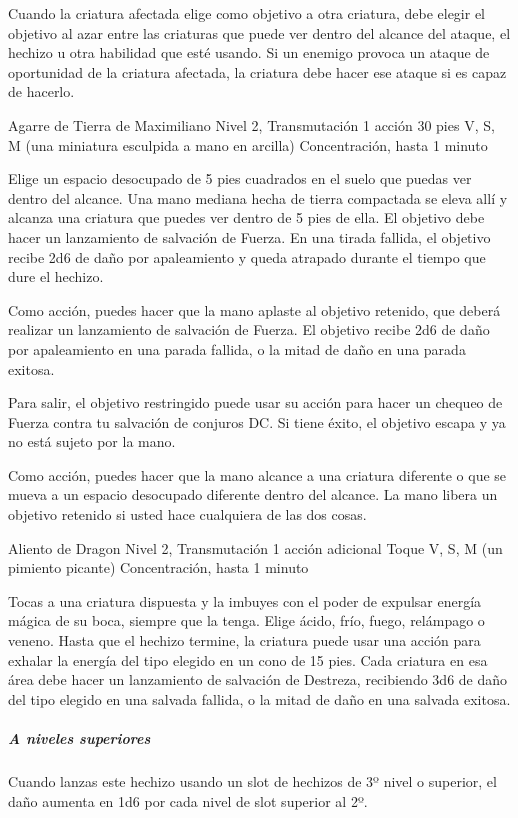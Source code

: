 \documentclass[a4paper,twocolumn,openany,10pt]{dndbook}
\begin{document}
	Cuando la criatura afectada elige como objetivo a otra criatura, debe elegir el objetivo al azar entre las criaturas que
	puede ver dentro del alcance del ataque, el hechizo u otra habilidad que esté usando. Si un enemigo provoca un ataque de
	oportunidad de la criatura afectada, la criatura debe hacer ese ataque si es capaz de hacerlo.

\spellheader%
	{Agarre de Tierra de Maximiliano}
	{Nivel 2, Transmutación}
	{1 acción}
	{30 pies}
	{V, S, M (una miniatura esculpida a mano en arcilla)}
	{Concentración, hasta 1 minuto}
	
	Elige un espacio desocupado de 5 pies cuadrados en el suelo que puedas ver dentro del alcance. Una mano mediana hecha de
	tierra compactada se eleva allí y alcanza una criatura que puedes ver dentro de 5 pies de ella. El objetivo debe hacer un
	lanzamiento de salvación de Fuerza. En una tirada fallida, el objetivo recibe 2d6 de daño por apaleamiento y queda atrapado
	durante el tiempo que dure el hechizo.
	
	Como acción, puedes hacer que la mano aplaste al objetivo retenido, que deberá realizar un lanzamiento de salvación de
	Fuerza. El objetivo recibe 2d6 de daño por apaleamiento en una parada fallida, o la mitad de daño en una parada exitosa.
	
	Para salir, el objetivo restringido puede usar su acción para hacer un chequeo de Fuerza contra tu salvación de conjuros DC.
	Si tiene éxito, el objetivo escapa y ya no está sujeto por la mano.
	
	Como acción, puedes hacer que la mano alcance a una criatura diferente o que se mueva a un espacio desocupado diferente
	dentro del alcance. La mano libera un objetivo retenido si usted hace cualquiera de las dos cosas. 

\spellheader%
	{Aliento de Dragon}
	{Nivel 2, Transmutación}
	{1 acción adicional}
	{Toque}
	{V, S, M (un pimiento picante)}
	{Concentración, hasta 1 minuto}
	
	Tocas a una criatura dispuesta y la imbuyes con el poder de expulsar energía mágica de su boca, siempre que la tenga. Elige
	ácido, frío, fuego, relámpago o veneno. Hasta que el hechizo termine, la criatura puede usar una acción para exhalar la
	energía del tipo elegido en un cono de 15 pies. Cada criatura en esa área debe hacer un lanzamiento de salvación de Destreza,
	recibiendo 3d6 de daño del tipo elegido en una salvada fallida, o la mitad de daño en una salvada exitosa.
	
	\subparagraph{A niveles superiores} Cuando lanzas este hechizo usando un slot de hechizos de 3º nivel o superior, el daño
	aumenta en 1d6 por cada nivel de slot superior al 2º. 
\end{document}
